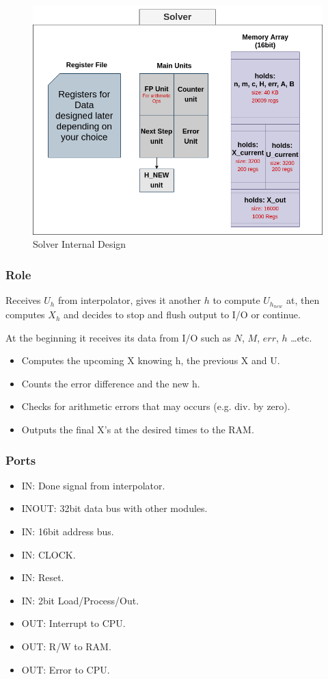 \documentclass[12pt]{report}
\begin{document}
\begin{figure}[hp]
    \centering
    \includegraphics[width=\textwidth]{images/solver}
    \caption{Solver Internal Design}
    \label{fig:solver}
\end{figure}


\subsubsection{Role}
Receives $U_h$ from interpolator, gives it another $h$ to compute $U_{h_{new}}$ at, then computes $X_h$ and decides to stop and flush output to I/O or continue.

At the beginning it receives its data from I/O such as $N$, $M$, $err$, $h$ \dots etc.

\begin{itemize}
    \item Computes the upcoming X knowing h, the previous X and U.
    \item Counts the error difference and the new h.
    \item Checks for arithmetic errors that may occurs (e.g. div. by zero).
    \item Outputs the final X's at the desired times to the RAM.
\end{itemize}

\subsubsection{Ports}
\begin{itemize}
    \item IN: Done signal from interpolator.
    \item INOUT: 32bit data bus with other modules.
    \item IN: 16bit address bus.
    \item IN: CLOCK.
    \item IN: Reset.
    \item IN: 2bit Load/Process/Out.
    \item OUT: Interrupt to CPU.
    \item OUT: R/W to RAM.
    \item OUT: Error to CPU.
\end{itemize}
\end{document}
